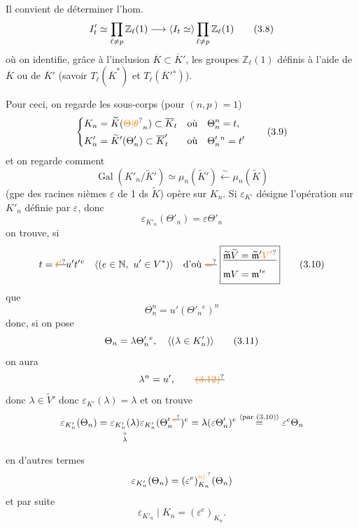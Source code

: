 Il convient de déterminer l'hom.
\[
I'_t\simeq\prod_{\ell\ne p}\mathbb Z_\ell(1)\longrightarrow\inserted{I_t\simeq}\prod_{\ell\ne p}\mathbb Z_\ell(1)\tag*{(3.8)}
\]
où on identifie, grâce à l'inclusion \(\overline K\subset\overline K'\), les  groupes \(\mathbb Z_\ell(1)\) définis à l'aide de \(\overline K\) ou de \(\overline K'\) (savoir \(T_\ell(\overline K^*)\) et \(T_\ell(\overline K'{}^*)\)).

Pour ceci, on regarde les sous-corps (pour \((n,p)=1\))
\[
\left\{\begin{aligned}
K_n&=\widetilde K(\unsure{\Theta|\theta}_n)\subset\overline K_t&\text{où}\quad&\Theta_n^n=t,\\
K'_n&=\widetilde K'(\Theta'_n)\subset\overline K'_t&\text{où}\quad&\Theta'_n{}^n=t'
\end{aligned}\right.\tag*{(3.9)}
\]
et on regarde comment
\[
\operatorname{Gal}(K'_n/\widetilde K')\simeq\mu_n(\widetilde K')\xleftarrow{\sim}\mu_n(\widetilde K)
\]
(gpe des racines \(n\)ièmes \(\varepsilon\) de 1 ds \(\widetilde K\)) opère sur \(K_n\). Si \(\varepsilon_{K'}\) désigne l'opération sur \(K'_n\) définie par \(\varepsilon\), donc
\[
\varepsilon_{K'_n}(\Theta'_n)=\varepsilon\Theta'_n
\]
on trouve, si
\[
t=\deleted{\unsure{t'}}u't'{}^e\quad\inserted{(e\in\mathbb N,\ u'\in V^*)}\quad
\text{d'où }\deleted{\unsure{=}}\ \boxed{\begin{aligned}&\deleted{\widetilde{\mathfrak m}\widetilde V=\widetilde{\mathfrak m}'\unsure{V'}}\\&\mathfrak m V=\mathfrak m'{}^e\end{aligned}}\tag*{(3.10)}
\]
que
\[
\Theta_n^n=u'(\Theta'_n{}^e)^n
\]
donc, si on pose
\[
\Theta_n=\lambda\Theta'_n{}^e,\quad\inserted{(\lambda\in K'_n)}\tag*{(3.11)}
\]
on aura
\[
\lambda^n=u',\tag*{\deleted{\unsure{(3.12)}}}
\]
donc  \(\lambda\in\widetilde V'\)  donc \(\varepsilon_{K'}(\lambda)=\lambda\) et on trouve
\[
\varepsilon_{K'_n}(\Theta_n)=\underset{\substack{\shortparallel\\\lambda}}{\varepsilon_{K'_n}(\lambda)}\varepsilon_{K'_n}(\Theta'_n{}^{\deleted{\unsure{e}}})^e=\lambda(\varepsilon\Theta'_n)^e\overset{\inserted{\text{par (3.10)}}}{=}\varepsilon^e\Theta_n
\]

en d'autres termes
\[
 \varepsilon_{K'_n}(\Theta_n)=(\varepsilon^e)^{\unsure{n|\cdot}}_{K_n}(\Theta_n)
\]
et par suite
\[
 \varepsilon_{K'_n}\mid K_n=(\varepsilon^e)_{K_n}.
\]

